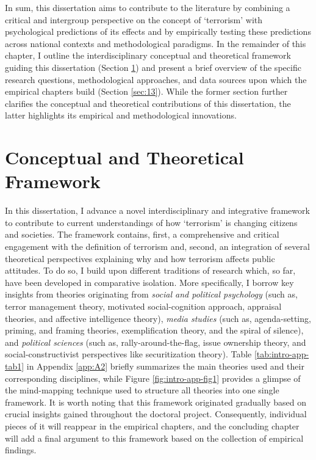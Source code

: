 In sum, this dissertation aims to contribute to the literature by combining a critical and intergroup perspective on the concept of `terrorism' with psychological predictions of its effects and by empirically testing these predictions across national contexts and methodological paradigms. In the remainder of this chapter, I outline the interdisciplinary conceptual and theoretical framework guiding this dissertation (Section \ref{sec:12}) and present a brief overview of the specific research questions, methodological approaches, and data sources upon which the empirical chapters build (Section \ref{sec:13}). While the former section further clarifies the conceptual and theoretical contributions of this dissertation, the latter highlights its empirical and methodological innovations.


\newpage
\section{Conceptual and Theoretical Framework}
\label{sec:12}

In this dissertation, I advance a novel interdisciplinary and integrative framework to contribute to current understandings of how `terrorism' is changing citizens and societies. The framework contains, first, a comprehensive and critical engagement with the definition of terrorism and, second, an integration of several theoretical perspectives explaining why and how terrorism affects public attitudes. To do so, I build upon different traditions of research which, so far, have been developed in comparative isolation. More specifically, I borrow key insights from theories originating from \textit{social and political psychology} (such as, terror management theory, motivated social-cognition approach, appraisal theories, and affective intelligence theory), \textit{media studies} (such as, agenda-setting, priming, and framing theories, exemplification theory, and the spiral of silence), and \textit{political sciences} (such as, rally-around-the-flag, issue ownership theory, and social-constructivist perspectives like securitization theory). Table \ref{tab:intro-app-tab1} in Appendix \ref{app:A2} briefly summarizes the main theories used and their corresponding disciplines, while Figure \ref{fig:intro-app-fig1} provides a glimpse of the mind-mapping technique used to structure all theories into one single framework. It is worth noting that this framework originated gradually based on crucial insights gained throughout the doctoral project. Consequently, individual pieces of it will reappear in the empirical chapters, and the concluding chapter will add a final argument to this framework based on the collection of empirical findings.


